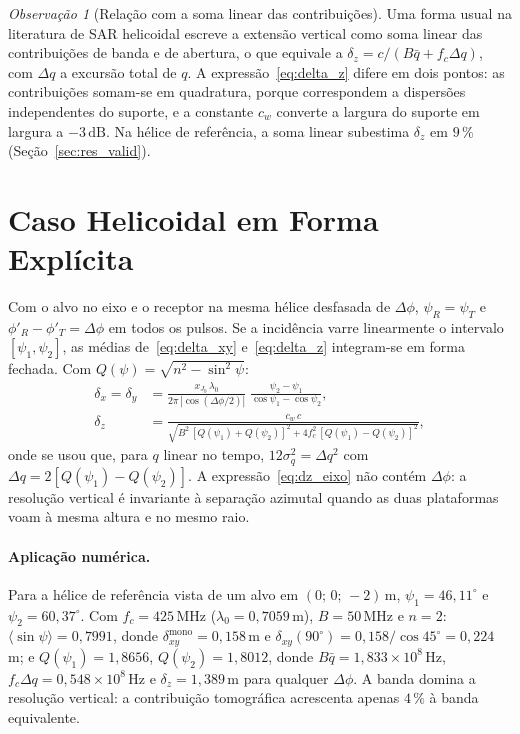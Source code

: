 \documentclass[12pt,a4paper,oneside]{book}
\theoremstyle{remark}
\newtheorem*{observacao}{Observação}
\newcommand{\dB}{\,\mathrm{dB}}
\theoremstyle{plain}
\theoremstyle{definition}
\begin{document}
\begin{observacao}[Relação com a soma linear das contribuições]
Uma forma usual na literatura de SAR helicoidal escreve a extensão vertical
como soma linear das contribuições de banda e de abertura, o que equivale a
$\delta_z=c/(B\bar q+f_c\Delta q)$, com $\Delta q$ a excursão total de $q$. A
expressão~\eqref{eq:delta_z} difere em dois pontos: as contribuições somam-se
em quadratura, porque correspondem a dispersões independentes do suporte, e a
constante $c_w$ converte a largura do suporte em largura a $-3\dB$. Na hélice de
referência, a soma linear subestima $\delta_z$ em $9\,\%$
(Seção~\ref{sec:res_valid}).
\end{observacao}

\section{Caso Helicoidal em Forma Explícita}
\label{sec:res_explicito}

Com o alvo no eixo e o receptor na mesma hélice desfasada de $\Delta\phi$,
$\psi_R=\psi_T$ e $\phi'_R-\phi'_T=\Delta\phi$ em todos os pulsos. Se a
incidência varre linearmente o intervalo $[\psi_1,\psi_2]$, as médias
de~\eqref{eq:delta_xy} e~\eqref{eq:delta_z} integram-se em forma fechada. Com
$Q(\psi)=\sqrt{n^2-\sin^2\psi}$:
\begin{align}
  \delta_x=\delta_y&=\frac{x_{J_0}\,\lambda_0}{2\pi\,|\cos(\Delta\phi/2)|}\;
  \frac{\psi_2-\psi_1}{\cos\psi_1-\cos\psi_2},\label{eq:dxy_eixo}\\
  \delta_z&=\frac{c_w\,c}{\sqrt{B^2\,[Q(\psi_1)+Q(\psi_2)]^2+4f_c^2\,[Q(\psi_1)-Q(\psi_2)]^2}} ,
  \label{eq:dz_eixo}
\end{align}
onde se usou que, para $q$ linear no tempo, $12\sigma_q^2=\Delta q^2$ com
$\Delta q=2[Q(\psi_1)-Q(\psi_2)]$. A expressão~\eqref{eq:dz_eixo} não contém
$\Delta\phi$: a resolução vertical é invariante à separação azimutal
quando as duas plataformas voam à mesma altura e no mesmo raio.

\paragraph{Aplicação numérica.} Para a hélice de referência vista de um alvo
em $(0;\,0;\,-2)\,$m, $\psi_1=46,11^\circ$ e $\psi_2=60,37^\circ$. Com
$f_c=425\,$MHz ($\lambda_0=0,7059\,$m), $B=50\,$MHz e $n=2$:
$\langle\sin\psi\rangle=0,7991$, donde $\delta_{xy}^{\text{mono}}=0,158\,$m e
$\delta_{xy}(90^\circ)=0,158/\cos45^\circ=0,224\,$m; e $Q(\psi_1)=1,8656$,
$Q(\psi_2)=1,8012$, donde $B\bar q=1,833\times10^{8}\,$Hz,
$f_c\Delta q=0,548\times10^{8}\,$Hz e $\delta_z=1,389\,$m para qualquer
$\Delta\phi$. A banda domina a resolução vertical: a contribuição tomográfica
acrescenta apenas $4\,\%$ à banda equivalente.
\end{document}
